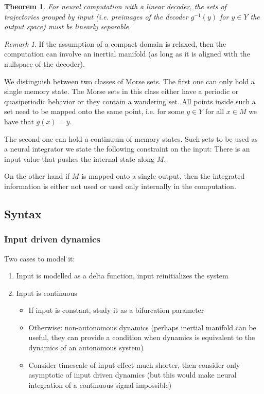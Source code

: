 \documentclass{scrartcl}
\newtheorem{theorem}{Theorem}
\theoremstyle{definition}
\theoremstyle{remark}
\newtheorem{remark}{Remark}
\begin{document}
\begin{theorem}
For neural computation with a linear decoder, the sets of trajectories grouped by input (i.e. preimages of the decoder $g^{-1}(y)$ for $y\in Y$ the output space) must be linearly separable.
\end{theorem}

\begin{remark}
If the assumption of a compact domain is relaxed, then the computation can involve an inertial manifold (as long as it is aligned with the nullspace of the decoder).
\end{remark}

We distinguish between two classes of Morse sets.
The first one can only hold a single memory state. 
The Morse sets in this class either have a periodic or quasiperiodic behavior or they contain a wandering set.
All points inside such a set need to be mapped onto the same point, i.e. for some $y\in Y$ for all $x\in M$ we have that $g(x)=y$.

The second one can hold a continuum of memory states. %
Such sets to be used as a neural integrator we state the following constraint on the input:
There is an input value that pushes the internal state along $M$.

On the other hand if $M$ is  mapped onto a single output, then the integrated information is either not used or used only internally in the computation.

\subsection{Syntax}%

\subsubsection{Input driven dynamics}
Two cases to model it:
\begin{enumerate}
\item Input is modelled as a delta function, input reinitializes the system
\item Input is continuous 
\begin{itemize}
\item If input is constant, study it as a bifurcation parameter
\item Otherwise: non-autonomous dynamics (perhaps inertial manifold can be useful, they can provide a condition when dynamics is equivalent to the dynamics of an autonomous system)
\item Consider timescale of input effect much shorter, then consider only asymptotic of input driven dynamics (but this would make neural integration of a continuous signal impossible)
\end{itemize}
\end{enumerate}
\end{document}
